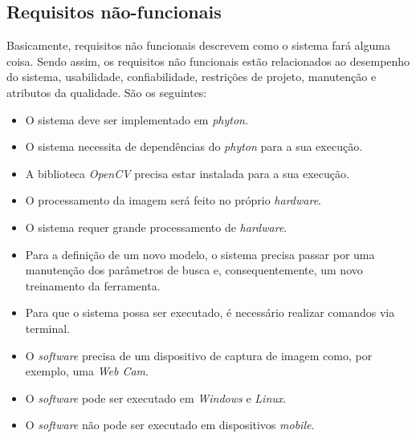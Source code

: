 \subsection{{Requisitos não-funcionais}}

Basicamente, requisitos não funcionais descrevem como o sistema fará alguma coisa. Sendo assim, os requisitos não funcionais estão relacionados ao desempenho do sistema, usabilidade, confiabilidade, restrições de projeto, manutenção e atributos da qualidade. São os seguintes:

\begin{itemize}
\raggedright \item O sistema deve ser implementado em \textit{phyton}.

\raggedright \item O sistema necessita de dependências do \textit{phyton} para a sua execução.

\raggedright \item A biblioteca \textit{OpenCV} precisa estar instalada para a sua execução.

\raggedright \item O processamento da imagem será feito no próprio \textit{hardware}.

\raggedright \item O sistema requer grande processamento de \textit{hardware}.

\raggedright \item Para a definição de um novo modelo, o sistema precisa passar por uma manutenção dos parâmetros de busca e, consequentemente, um novo treinamento da ferramenta.

\raggedright \item Para que o sistema possa ser executado, é necessário realizar comandos via terminal.

\raggedright \item O \textit{software} precisa de um dispositivo de captura de imagem como, por exemplo, uma \textit{Web Cam}.

\raggedright \item O \textit{software} pode ser executado em \textit{Windows} e \textit{Linux}.

\raggedright \item O \textit{software} não pode ser executado em dispositivos \textit{mobile}.
\end{itemize}